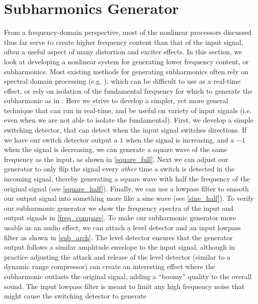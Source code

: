 \documentclass[twoside,a4paper]{article}
\begin{document}
\section{Subharmonics Generator} \label{sec:subharm}
%
From a frequency-domain perspective, most of the nonlinear processors
discussed thus far serve to create higher frequency content than that
of the input signal, often a useful aspect of many distortion and exciter
effects. In this section, we look at developing a nonlinear system for
generating lower frequency content, or subharmonics. Most existing
methods for generating subharmonics often rely on spectral domain
processing (e.g. \cite{sub_spectral}), which can be difficult to use
as a real-time effect, or rely on isolation of the fundamental frequency
for which to generate the subharmonic as in \cite{sub_sqrt}. Here we
strive to develop a simpler, yet more general technique that can run in
real-time, and be useful on  variety of input signals (i.e. even when
we are not able to isolate the fundamental).
\newline\newline
First, we develop a simple switching detector, that can detect when the
input signal switches directions. If we have our switch detector output
a $1$ when the signal is increasing, and a $-1$ when the signal is
decreasing, we can generate a square wave of the same frequency as the
input, as shown in \cref{square_full}. Next we can adjust our generator to
only flip the signal every {\it other} time a switch is detected in the
incoming signal, thereby generating a square wave with half the frequency
of the original signal (see \cref{square_half}). Finally, we can use a
lowpass filter to smooth our output signal into something more like a
sine wave (see \cref{sine_half}). To verify our subharmonic generator
we show the frequency spectra of the input and output signals in
\cref{freq_compare}.
\newline\newline
To make our subharmonic generator more usable as an audio effect, we can
attach a level detector and an input lowpass filter as shown in
\cref{sub_arch}. The level detector ensures that the generator output
follows a similar amplitude envelope to the input signal, although in
practice adjusting the attack and release of the level detector (similar
to a dynamic range compressor) can create an interesting effect where the
subharmonic outlasts the original signal, adding a ``boomy'' quality to
the overall sound. The input lowpass filter is meant to limit any high
frequency noise that might cause the switching detector to generate
\end{document}
